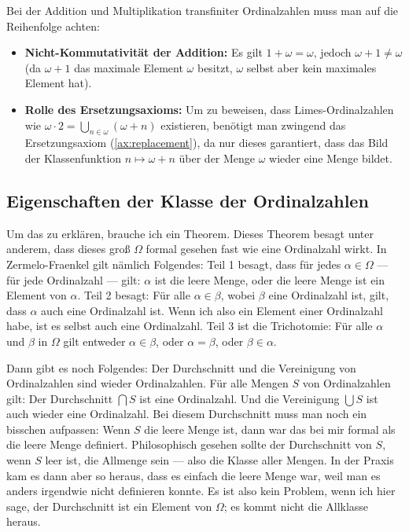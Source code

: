 \begin{didactic-insight}
Bei der Addition und Multiplikation transfiniter Ordinalzahlen muss man auf die Reihenfolge achten:
\begin{itemize}
    \item \textbf{Nicht-Kommutativität der Addition:} Es gilt $1 + \omega = \omega$, jedoch $\omega + 1 \neq \omega$ (da $\omega + 1$ das maximale Element $\omega$ besitzt, $\omega$ selbst aber kein maximales Element hat).
    \item \textbf{Rolle des Ersetzungsaxioms:} Um zu beweisen, dass Limes-Ordinalzahlen wie $\omega \cdot 2 = \bigcup_{n \in \omega} (\omega + n)$ existieren, benötigt man zwingend das Ersetzungsaxiom (\cref{ax:replacement}), da nur dieses garantiert, dass das Bild der Klassenfunktion $n \mapsto \omega + n$ über der Menge $\omega$ wieder eine Menge bildet.
\end{itemize}
\end{didactic-insight}

\subsection{Eigenschaften der Klasse der Ordinalzahlen}

\begin{spoken-clean}[00:36:15 - 00:37:50]
Um das zu erklären, brauche ich ein Theorem. Dieses Theorem besagt unter anderem, dass dieses groß $\Omega$ formal gesehen fast wie eine Ordinalzahl wirkt. In Zermelo-Fraenkel gilt nämlich Folgendes: Teil 1 besagt, dass für jedes $\alpha \in \Omega$ --- für jede Ordinalzahl --- gilt: $\alpha$ ist die leere Menge, oder die leere Menge ist ein Element von $\alpha$. Teil 2 besagt: Für alle $\alpha \in \beta$, wobei $\beta$ eine Ordinalzahl ist, gilt, dass $\alpha$ auch eine Ordinalzahl ist. Wenn ich also ein Element einer Ordinalzahl habe, ist es selbst auch eine Ordinalzahl. Teil 3 ist die Trichotomie: Für alle $\alpha$ und $\beta$ in $\Omega$ gilt entweder $\alpha \in \beta$, oder $\alpha = \beta$, oder $\beta \in \alpha$.

Dann gibt es noch Folgendes: Der Durchschnitt und die Vereinigung von Ordinalzahlen sind wieder Ordinalzahlen. Für alle Mengen $S$ von Ordinalzahlen gilt: Der Durchschnitt $\bigcap S$ ist eine Ordinalzahl. Und die Vereinigung $\bigcup S$ ist auch wieder eine Ordinalzahl. Bei diesem Durchschnitt muss man noch ein bisschen aufpassen: Wenn $S$ die leere Menge ist, dann war das bei mir formal als die leere Menge definiert. Philosophisch gesehen sollte der Durchschnitt von $S$, wenn $S$ leer ist, die Allmenge sein --- also die Klasse aller Mengen. In der Praxis kam es dann aber so heraus, dass es einfach die leere Menge war, weil man es anders irgendwie nicht definieren konnte. Es ist also kein Problem, wenn ich hier sage, der Durchschnitt ist ein Element von $\Omega$; es kommt nicht die Allklasse heraus.
\end{spoken-clean}

